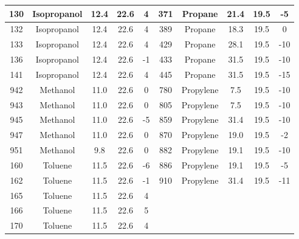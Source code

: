 \begin{table}[!ht]
\begin{tabular}{|c|c|c|c|c||c|c|c|c|c|}
130    & Isopropanol   & 12.4     & 22.6             & 4              &  371    & Propane       & 21.4     & 19.5             & -5              \\ \hline
132    & Isopropanol   & 12.4     & 22.6             & 4              &  389    & Propane       & 18.3     & 19.5             & 0               \\ \hline
133    & Isopropanol   & 12.4     & 22.6             & 4              &  429    & Propane       & 28.1     & 19.5             & -10             \\ \hline
136    & Isopropanol   & 12.4     & 22.6             & -1             &  433    & Propane       & 31.5     & 19.5             & -10             \\ \hline
141    & Isopropanol   & 12.4     & 22.6             & 4              &  445    & Propane       & 31.5     & 19.5             & -15             \\ \hline
942    & Methanol      & 11.0     & 22.6             & 0              &  780    & Propylene     & 7.5      & 19.5             & -10             \\ \hline
943    & Methanol      & 11.0     & 22.6             & 0              &  805    & Propylene     & 7.5      & 19.5             & -10             \\ \hline
945    & Methanol      & 11.0     & 22.6             & -5             &  859    & Propylene     & 31.4     & 19.5             & -10             \\ \hline
947    & Methanol      & 11.0     & 22.6             & 0              &  870    & Propylene     & 19.0     & 19.5             & -2              \\ \hline
951    & Methanol      & 9.8      & 22.6             & 0              &  882    & Propylene     & 19.1     & 19.5             & -10             \\ \hline
160    & Toluene       & 11.5     & 22.6             & -6             &  886    & Propylene     & 19.1     & 19.5             & -5              \\ \hline
162    & Toluene       & 11.5     & 22.6             & -1             &  910    & Propylene     & 31.4     & 19.5             & -11             \\ \hline
165    & Toluene       & 11.5     & 22.6             & 4              &  \multicolumn{5}{c|}{}                                                  \\ \cline{1-5}
166    & Toluene       & 11.5     & 22.6             & 5              &  \multicolumn{5}{c|}{}                                                  \\ \cline{1-5}
170    & Toluene       & 11.5     & 22.6             & 4              &  \multicolumn{5}{c|}{}                                                  \\ \hline
\end{tabular}
\end{table}

